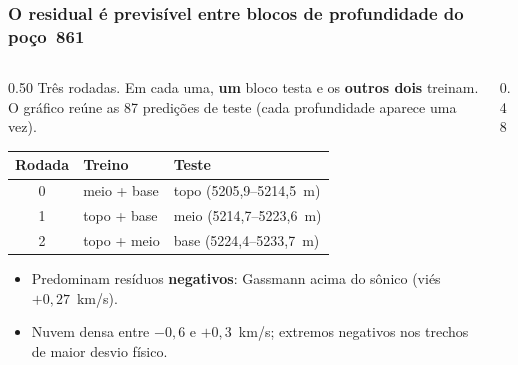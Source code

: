 \documentclass[aspectratio=169,10pt]{beamer}
\begin{document}
\begin{frame}[t]
  \frametitle{O residual é previsível entre blocos de profundidade do poço~861}
  \begin{columns}[T,onlytextwidth]
    \begin{column}{0.50\textwidth}
      \footnotesize
      Três rodadas. Em cada uma, \textbf{um} bloco testa e os
      \textbf{outros dois} treinam. O gráfico reúne as 87 predições de
      teste (cada profundidade aparece uma vez).
      \vspace{0.06cm}

      \centering
      \scriptsize
      \setlength{\tabcolsep}{2.6pt}
      \begin{tabular}{cll}
        \toprule
        Rodada & Treino & Teste \\
        \midrule
        0 & meio + base & topo (5205,9--5214,5~m) \\
        1 & topo + base & meio (5214,7--5223,6~m) \\
        2 & topo + meio & base (5224,4--5233,7~m) \\
        \bottomrule
      \end{tabular}

      \vspace{0.08cm}
      \raggedright
      \footnotesize
      \begin{itemize}
        \item Predominam resíduos \textbf{negativos}: Gassmann acima do
              sônico (viés $+0{,}27$~km/s).
        \item Nuvem densa entre $-0{,}6$ e $+0{,}3$~km/s; extremos
              negativos nos trechos de maior desvio físico.
      \end{itemize}
    \end{column}
    \begin{column}{0.48\textwidth}
    \end{column}
  \end{columns}
\end{frame}
\end{document}
